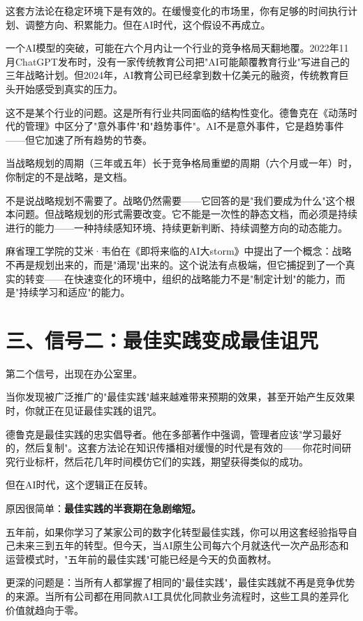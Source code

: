 这套方法论在稳定环境下是有效的。在缓慢变化的市场里，你有足够的时间执行计划、调整方向、积累能力。但在AI时代，这个假设不再成立。

一个AI模型的突破，可能在六个月内让一个行业的竞争格局天翻地覆。2022年11月ChatGPT发布时，没有一家传统教育公司把"AI可能颠覆教育行业"写进自己的三年战略计划。但2024年，AI教育公司已经拿到数十亿美元的融资，传统教育巨头开始感受到真实的压力。

这不是某个行业的问题。这是所有行业共同面临的结构性变化。德鲁克在《动荡时代的管理》中区分了"意外事件"和"趋势事件"。AI不是意外事件，它是趋势事件——但它加速了所有趋势的节奏。

当战略规划的周期（三年或五年）长于竞争格局重塑的周期（六个月或一年）时，你制定的不是战略，是文档。

不是说战略规划不需要了。战略仍然需要——它回答的是"我们要成为什么"这个根本问题。但战略规划的形式需要改变。它不能是一次性的静态文档，而必须是持续进行的能力——一种持续感知环境、持续更新判断、持续调整方向的动态能力。

麻省理工学院的艾米·韦伯在《即将来临的AI大storm》中提出了一个概念：战略不再是规划出来的，而是"涌现"出来的。这个说法有点极端，但它捕捉到了一个真实的转变——在快速变化的环境中，组织的战略能力不是"制定计划"的能力，而是"持续学习和适应"的能力。


\section{三、信号二：最佳实践变成最佳诅咒}


第二个信号，出现在办公室里。

当你发现被广泛推广的"最佳实践"越来越难带来预期的效果，甚至开始产生反效果时，你就正在见证最佳实践的诅咒。

德鲁克是最佳实践的忠实倡导者。他在多部著作中强调，管理者应该"学习最好的，然后复制"。这套方法论在知识传播相对缓慢的时代是有效的——你花时间研究行业标杆，然后花几年时间模仿它们的实践，期望获得类似的成功。

但在AI时代，这个逻辑正在反转。

原因很简单：\textbf{最佳实践的半衰期在急剧缩短。}

五年前，如果你学习了某家公司的数字化转型最佳实践，你可以用这套经验指导自己未来三到五年的转型。但今天，当AI原生公司每六个月就迭代一次产品形态和运营模式时，"五年前的最佳实践"可能已经是今天的负面教材。

更深的问题是：当所有人都掌握了相同的"最佳实践"，最佳实践就不再是竞争优势的来源。当所有公司都在用同款AI工具优化同款业务流程时，这些工具的差异化价值就趋向于零。

